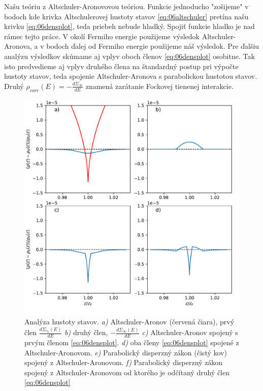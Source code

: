  Našu teóriu z Altschuler-Aronovovou teóriou. Funkcie jednoducho "zošijeme" v bodoch kde krivka Altschulerovej hustoty stavov \eqref{eq:06altschuler} pretína našu krivku \eqref{eq:06densplot}, teda priebeh nebude hladký. Spojiť funkcie hladko je nad rámec tejto práce. V okolí Fermiho energie použijeme výsledok Altschuler-Aronova, a v bodoch ďalej od Fermiho energie použijeme náš výsledok. Pre ďalšiu analýzu výsledkov skúmame aj vplyv oboch členov \eqref{eq:06densplot} osobitne. Tak isto predvedieme aj vplyv druhého člena na štandardný postup pri výpočte hustoty stavov, teda spojenie Altschuler-Aronova s parabolickou hustotou stavov. Druhý $\rho_{corr}(E)=-\frac{d\Sigma_{\infty}}{dE}$  znamená zarátanie Fockovej tienenej interakcie.
\begin{figure}[H]
\centering
\includegraphics[scale=0.8]{grafy/plot_tau_1_c_1}
\caption{Analýza hustoty stavov. {\it a)} Altschuler-Aronov (červená čiara), prvý člen $\frac{d\Sigma_{\tau_0}(E)}{dE}$ {\it b)} druhý člen, $-\frac{d\Sigma_{\infty}(E)}{dE}$  {\it c)} Altschuler-Aronov spojený s prvým členom  \eqref{eq:06densplot}. {\it d)} oba členy \eqref{eq:06densplot} spojené z Altschuler-Aronovom. {\it e)} Parabolický disperzný zákon (čistý kov) spojený z Altschuler-Aronovom. {\it f)} Parabolický disperzný zákon spojený z Altschuler-Aronovom od ktorého je odčítaný druhý člen \eqref{eq:06densplot}}
\label{fig:results}
\end{figure}

